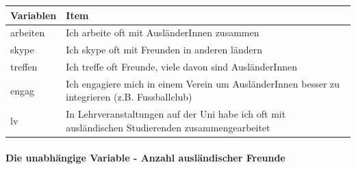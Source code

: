 \documentclass[]{article}
\let\oldparagraph\paragraph
\renewcommand{\paragraph}[1]{\oldparagraph{#1}\mbox{}}
\begin{document}
\begin{longtable}[]{@{}ll@{}}
\toprule
\begin{minipage}[b]{0.09\columnwidth}\raggedright\strut
Variablen\strut
\end{minipage} & \begin{minipage}[b]{0.85\columnwidth}\raggedright\strut
Item\strut
\end{minipage}\tabularnewline
\midrule
\endhead
\begin{minipage}[t]{0.09\columnwidth}\raggedright\strut
arbeiten\strut
\end{minipage} & \begin{minipage}[t]{0.85\columnwidth}\raggedright\strut
Ich arbeite oft mit AusländerInnen zusammen\strut
\end{minipage}\tabularnewline
\begin{minipage}[t]{0.09\columnwidth}\raggedright\strut
skype\strut
\end{minipage} & \begin{minipage}[t]{0.85\columnwidth}\raggedright\strut
Ich skype oft mit Freunden in anderen ländern\strut
\end{minipage}\tabularnewline
\begin{minipage}[t]{0.09\columnwidth}\raggedright\strut
treffen\strut
\end{minipage} & \begin{minipage}[t]{0.85\columnwidth}\raggedright\strut
Ich treffe oft Freunde, viele davon sind AusländerInnen\strut
\end{minipage}\tabularnewline
\begin{minipage}[t]{0.09\columnwidth}\raggedright\strut
engag\strut
\end{minipage} & \begin{minipage}[t]{0.85\columnwidth}\raggedright\strut
Ich engagiere mich in einem Verein um AusländerInnen besser zu
integrieren (z.B. Fussballclub)\strut
\end{minipage}\tabularnewline
\begin{minipage}[t]{0.09\columnwidth}\raggedright\strut
lv\strut
\end{minipage} & \begin{minipage}[t]{0.85\columnwidth}\raggedright\strut
In Lehrveranstaltungen auf der Uni habe ich oft mit ausländischen
Studierenden zusammengearbeitet\strut
\end{minipage}\tabularnewline
\bottomrule
\end{longtable}

\paragraph{Die unabhängige Variable - Anzahl ausländischer
Freunde}\label{die-unabhangige-variable---anzahl-auslandischer-freunde}
\end{document}
